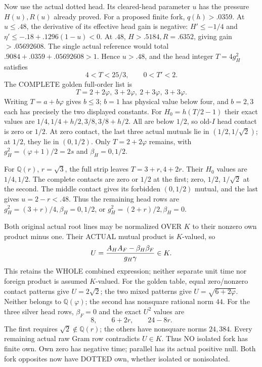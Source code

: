 Now use the actual dotted head.
Its cleared-head parameter \(u\) has
the pressure \(H(u),R(u)\) already proved.
For a proposed finite fork, \(q(h)>.0359\).
At \(u\le.48\), the derivative of its
effective head gain is negative:
\(H'\le-1/4\) and
\(\eta'\le-.18+.1296(1-u)<0\).
At \(.48\), \(H>.5184,R=.6352\),
giving gain \(>.05692608\).
The single actual reference would total
\(.9084+.0359+.05692608>1\).
Hence \(u>.48\), and the head integer
\(T=4g_H^2\) satisfies
\[
                         4<T<25/3,\qquad0<T'<2 .
\]
The COMPLETE golden full-order list is
\[
                         T=2+2\varphi,\ 3+2\varphi,\ 2+3\varphi,\ 3+3\varphi .
\]
Writing \(T=a+b\varphi\) gives \(b\le3\);
\(b=1\) has physical value below four,
and \(b=2,3\) each has precisely the
two displayed constants.
For \(H_0=h(T/2-1)\) their exact values
are \(1/4,1/4+h/2,3/8,3/8+h/2\).
All are below \(1/2\), so old-\(I\)
head contact is zero or \(1/2\).
At zero contact, the last three actual
mutuals lie in \((1/2,1/\sqrt2)\);
at \(1/2\), they lie in \((0,1/2)\).
Only \(T=2+2\varphi\) remains, with
\(g_H^2=(\varphi+1)/2=2s\) and
\(\beta_H=0,1/2\).

For \(\mathbb Q(r)\), \(r=\sqrt3\),
the full strip leaves \(T=3+r,4+2r\).
Their \(H_0\) values are \(1/4,1/2\).
The complete contacts are zero or
\(1/2\) at the first; zero, \(1/2\),
\(1/\sqrt2\) at the second.
The middle contact gives its forbidden
\((0,1/2)\) mutual, and the last gives
\(u=2-r<.48\).
Thus the remaining head rows are
\(g_H^2=(3+r)/4,\beta_H=0,1/2\),
or \(g_H^2=(2+r)/2,\beta_H=0\).

Both original actual root lines may
be normalized OVER \(K\) to their
nonzero own product minus one.
Their ACTUAL mutual product is \(K\)-valued,
so
\[
                  U={A_HA_F-\beta_H\beta_F\over g_H\gamma}\in K .
\]
This retains the WHOLE combined expression;
neither separate unit time nor foreign
product is assumed \(K\)-valued.
For the golden table, equal zero/nonzero
contact patterns give \(U=2\sqrt2\);
the two mixed patterns give
\(U=\sqrt{6+2\varphi}\).
Neither belongs to \(\mathbb Q(\varphi)\);
the second has nonsquare rational norm
\(44\).
For the three silver head rows,
\(\beta_F=0\) and the exact \(U^2\) values
are
\[
                             8,\qquad6+2r,\qquad24-8r .
\]
The first requires \(\sqrt2\notin\mathbb Q(r)\);
the others have nonsquare norms \(24,384\).
Every remaining actual raw Gram row
contradicts \(U\in K\).
Thus NO isolated fork has finite own.
Own zero has negative time; parallel
has its actual positive null.
Both fork opposites now have DOTTED
own, whether isolated or nonisolated.

